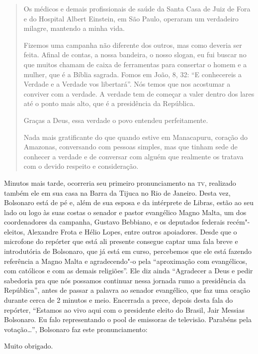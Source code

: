 \begin{quote}
Os médicos e demais profissionais de saúde da Santa Casa de Juiz de Fora
e do Hospital Albert Einstein, em São Paulo, operaram um verdadeiro
milagre, mantendo a minha vida.

Fizemos uma campanha não diferente dos outros, mas como deveria ser
feita. Afinal de contas, a nossa bandeira, o nosso slogan, eu fui buscar
no que muitos chamam de caixa de ferramentas para consertar o homem e a
mulher, que é a Bíblia sagrada. Fomos em João, 8, 32: ``E conhecereis a
Verdade e a Verdade vos libertará''. Nós temos que nos acostumar a
conviver com a verdade. A verdade tem de começar a valer dentro dos
lares até o ponto mais alto, que é a presidência da República.

Graças a Deus, essa verdade o povo entendeu perfeitamente.

Nada mais gratificante do que quando estive em Manacapuru, coração do
Amazonas, conversando com pessoas simples, mas que tinham sede de
conhecer a verdade e de conversar com alguém que realmente os tratava
com o devido respeito e consideração.
\end{quote}

Minutos mais tarde, ocorreria seu primeiro pronunciamento na \textsc{tv},
realizado também ele em sua casa na Barra da Tijuca no Rio de Janeiro.
Desta vez, Bolsonaro está de pé e, além de sua esposa e da intérprete de
Libras, estão ao seu lado ou logo às suas costas o senador e pastor
evangélico Magno Malta, um dos coordenadores da campanha, Gustavo
Bebbiano, e os deputados federais recém"-eleitos, Alexandre Frota e Hélio
Lopes, entre outros apoiadores. Desde que o microfone do repórter que
está ali presente consegue captar uma fala breve e introdutória de
Bolsonaro, que já está em curso, percebemos que ele está fazendo
referência a Magno Malta e agradecendo"-o pela ``aproximação com
evangélicos, com católicos e com as demais religiões''. Ele diz ainda
``Agradecer a Deus e pedir sabedoria pra que nós possamos continuar
nessa jornada rumo a presidência da República'', antes de passar a
palavra ao senador evangélico, que faz uma oração durante cerca de 2
minutos e meio. Encerrada a prece, depois desta fala do repórter,
``Estamos ao vivo aqui com o presidente eleito do Brasil, Jair Messias
Bolsonaro. Eu falo representando o pool de emissoras de televisão.
Parabéns pela votação\ldots{}'', Bolsonaro faz este pronunciamento:

Muito obrigado.

